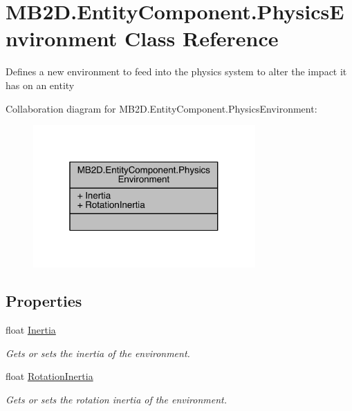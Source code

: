 \hypertarget{class_m_b2_d_1_1_entity_component_1_1_physics_environment}{}\section{M\+B2\+D.\+Entity\+Component.\+Physics\+Environment Class Reference}
\label{class_m_b2_d_1_1_entity_component_1_1_physics_environment}


Defines a new environment to feed into the physics system to alter the impact it has on an entity  




Collaboration diagram for M\+B2\+D.\+Entity\+Component.\+Physics\+Environment\+:\nopagebreak
\begin{figure}[H]
\begin{center}
\leavevmode
\includegraphics[width=241pt]{class_m_b2_d_1_1_entity_component_1_1_physics_environment__coll__graph}
\end{center}
\end{figure}
\subsection*{Properties}
\begin{DoxyCompactItemize}
\item 
float \hyperlink{class_m_b2_d_1_1_entity_component_1_1_physics_environment_a67ab743dbbe138e3eac38871e51c21d6}{Inertia}
\begin{DoxyCompactList}\small\item\em Gets or sets the inertia of the environment. \end{DoxyCompactList}\item 
float \hyperlink{class_m_b2_d_1_1_entity_component_1_1_physics_environment_a1c2fdbef41b7dee04b59200dd5d90cdc}{Rotation\+Inertia}
\begin{DoxyCompactList}\small\item\em Gets or sets the rotation inertia of the environment. \end{DoxyCompactList}\end{DoxyCompactItemize}


